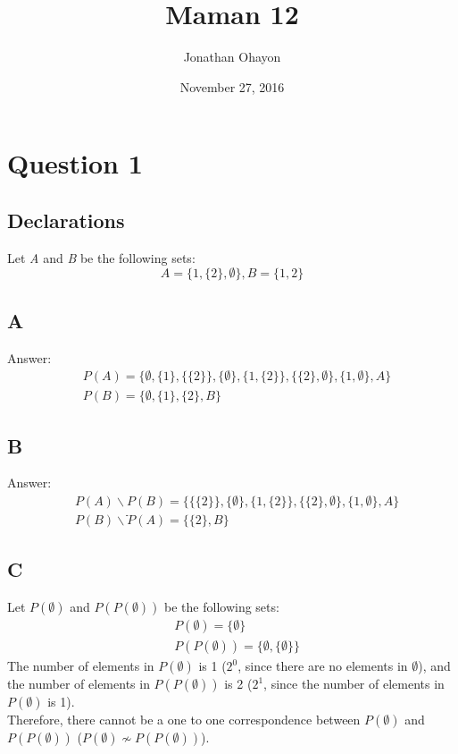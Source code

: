 \documentclass[12pt, oneside]{article}
\title{Maman 12}
\author{Jonathan Ohayon}
\date{November 27, 2016}
\begin{document}
\maketitle

\section{Question 1}
\setcounter{subsection}{-1}
\subsection{Declarations}
Let \emph{A} and \emph{B} be the following sets:
\begin{equation*}
A = \{1, \{2\}, \emptyset\}, B = \{1, 2\}
\end{equation*}

\subsection{A}
Answer:
\begin{equation*}
\begin{split}
& P(A) = \{\emptyset, \{1\}, \{\{2\}\}, \{\emptyset\}, \{1, \{2\}\}, \{\{2\}, \emptyset\}, \{1, \emptyset\}, A\}\\
& P(B) = \{\emptyset, \{1\}, \{2\}, B\}
\end{split}
\end{equation*}

\subsection{B}
Answer:
\begin{equation*}
\begin{split}
& P(A) \backslash P(B) = \{\{\{2\}\}, \{\emptyset\}, \{1, \{2\}\}, \{\{2\}, \emptyset\}, \{1, \emptyset\}, A\}\\
& P(B) \backslash ֿP(A) = \{\{2\}, B\}
\end{split}
\end{equation*}
\clearpage

\subsection{C}
Let $P(\emptyset)$ and $P(P(\emptyset))$ be the following sets:
\begin{equation*}
\begin{split}
& P(\emptyset) = \{\emptyset\}\\
& P(P(\emptyset)) = \{\emptyset, \{\emptyset\}\}
\end{split}
\end{equation*}
The number of elements in $P(\emptyset)$ is 1 ($2^0$, since there are no elements in $\emptyset$), and the number of elements in $P(P(\emptyset))$ is 2 ($2^1$, since the number of elements in $P(\emptyset)$ is 1).\\
Therefore, there cannot be a one to one correspondence between $P(\emptyset)$ and $P(P(\emptyset))$ ($P(\emptyset) \not\sim P(P(\emptyset))$).
\end{document}
